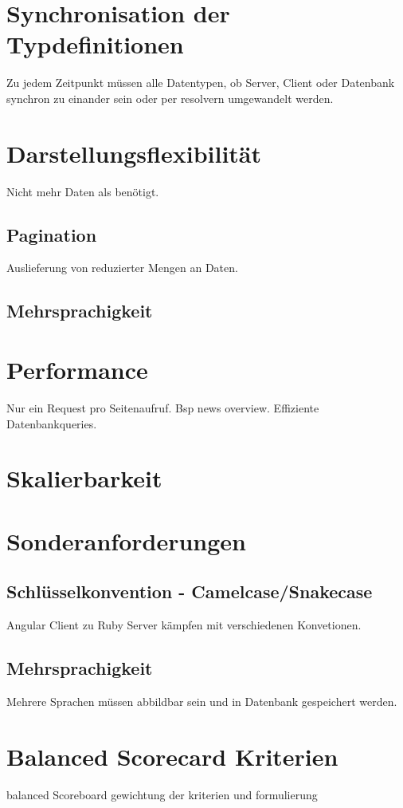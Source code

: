 \section{Synchronisation der Typdefinitionen}
Zu jedem Zeitpunkt müssen alle Datentypen, ob Server, Client oder Datenbank synchron zu einander sein oder per resolvern umgewandelt werden.

\section{Darstellungsflexibilität}
Nicht mehr Daten als benötigt.
\subsection{Pagination}
Auslieferung von reduzierter Mengen an Daten.
\subsection{Mehrsprachigkeit}

\section{Performance}
Nur ein Request pro Seitenaufruf. Bsp news overview. Effiziente Datenbankqueries.

\section{Skalierbarkeit}

\section{Sonderanforderungen}
\subsection{Schlüsselkonvention - Camelcase/Snakecase}
Angular Client zu Ruby Server kämpfen mit verschiedenen Konvetionen.
\subsection{Mehrsprachigkeit}
Mehrere Sprachen müssen abbildbar sein und in Datenbank gespeichert werden.
\section{Balanced Scorecard Kriterien}
balanced Scoreboard gewichtung der kriterien und formulierung

